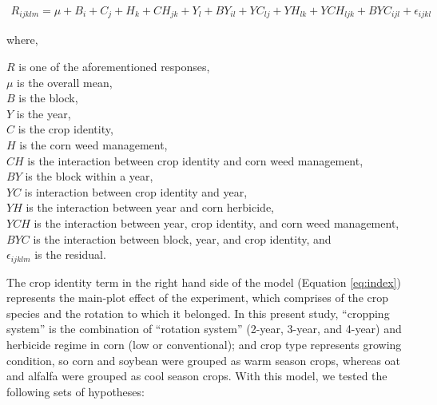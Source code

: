 \documentclass[
]{article}
\begin{document}
\begin{align}
R_{ijklm} = \mu + B_i + C_j + H_k + CH_{jk} + Y_l + BY_{il} + YC_{lj} + YH_{lk} + YCH_{ljk} + BYC_{ijl} + \epsilon_{ijkl}
\label{eq:index}
\end{align}

where,

\(R\) is one of the aforementioned responses,\\
\(\mu\) is the overall mean,\\
\(B\) is the block,\\
\(Y\) is the year,\\
\(C\) is the crop identity,\\
\(H\) is the corn weed management,\\
\(CH\) is the interaction between crop identity and corn weed management,\\
\(BY\) is the block within a year,\\
\(YC\) is interaction between crop identity and year,\\
\(YH\) is the interaction between year and corn herbicide,\\
\(YCH\) is the interaction between year, crop identity, and corn weed management,\\
\(BYC\) is the interaction between block, year, and crop identity, and\\
\(\epsilon_{ijklm}\) is the residual.

The crop identity term in the right hand side of the model (Equation \eqref{eq:index}) represents the main-plot effect of the experiment, which comprises of the crop species and the rotation to which it belonged. In this present study, ``cropping system'' is the combination of ``rotation system'' (2-year, 3-year, and 4-year) and herbicide regime in corn (low or conventional); and crop type represents growing condition, so corn and soybean were grouped as warm season crops, whereas oat and alfalfa were grouped as cool season crops. With this model, we tested the following sets of hypotheses:
\end{document}
